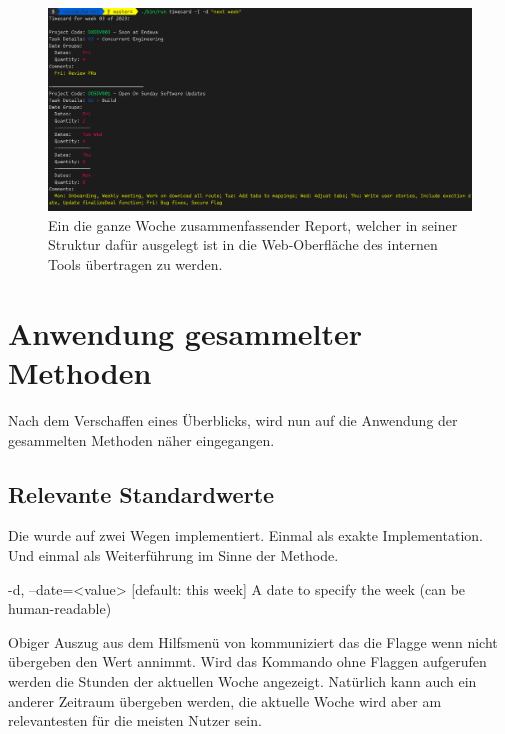 \documentclass[oneside,bibliography=totocnumbered,BCOR=5mm]{scrbook}
\newenvironment{code}{\captionsetup{type=listing, skip=0pt}}{}
\begin{document}
\begin{figure}
  \centering
  \includegraphics[scale=0.5]{timecard-real.png}
  \caption{Ein die ganze Woche zusammenfassender Report, welcher in seiner Struktur dafür ausgelegt ist in die Web-Oberfläche des internen Tools übertragen zu werden.}
  \label{fig:timecard}
\end{figure}

\section{Anwendung gesammelter Methoden}

Nach dem Verschaffen eines Überblicks, wird nun auf die Anwendung der
gesammelten Methoden näher eingegangen.

\subsection{Relevante Standardwerte}
\label{sec:impl_defaults}


Die  wurde auf zwei Wegen implementiert. Einmal als
exakte Implementation. Und einmal als Weiterführung im Sinne der Methode.

\begin{code}
  \begin{shellcode}
-d, --date=<value>  [default: this week] A date to specify the week (can be human-readable)
  \end{shellcode}
  \medskip
\end{code}

Obiger Auszug aus dem Hilfsmenü von  kommuniziert das
die  Flagge wenn nicht übergeben den Wert  annimmt. Wird das Kommando  ohne Flaggen aufgerufen
werden die Stunden der aktuellen Woche angezeigt. Natürlich kann auch ein
anderer Zeitraum übergeben werden, die aktuelle Woche wird aber am relevantesten
für die meisten Nutzer sein.
\end{document}
